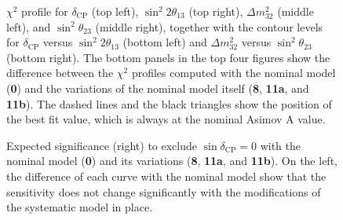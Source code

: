 \begin{figure}
	\centering
	\resizebox{0.49\linewidth}{!}{}
	\resizebox{0.49\linewidth}{!}{}
	\resizebox{0.49\linewidth}{!}{}
	\resizebox{0.49\linewidth}{!}{}
	\resizebox{0.49\linewidth}{!}{}	%
	\resizebox{0.49\linewidth}{!}{}	%
	\caption[$\chi^2$ profiles for $\delta_\text{CP}$, $\Delta m_{32}^2$, $\sin^2 2\theta_{13}$, and $\sin\theta_{23}$ %
		and contours for $\Delta m_{32}^2$ versus $\sin\theta_{23}$ and $\delta_\text{CP}$ versus $\sin^2 2\theta_{13}$ %
		with variations on the nominal systematic model]%
		{$\chi^2$ profile for $\delta_\text{CP}$ (top left), $\sin^2 2\theta_{13}$ (top right), %
		$\Delta m_{32}^2$ (middle left), and $\sin^2 \theta_{23}$ (middle right), %
		together with the contour levels for $\delta_\text{CP}$ versus $\sin^2 2\theta_{13}$ (bottom left) %
		and $\Delta m_{32}^2$ versus $\sin^2 \theta_{23}$ (bottom right).
		The bottom panels in the top four figures show the difference between the $\chi^2$ profiles computed %
		with the nominal model (\textbf{0}) and the variations of the nominal model itself %
		(\textbf{8}, \textbf{11a}, and \textbf{11b}).
		The dashed lines and the black triangles show the position of the best fit value, %
		which is always at the nominal Asimov A value.}
	\label{fig:0_11a_11b_8_profile}
\end{figure}

\begin{figure}
	\centering
	\resizebox{0.49\linewidth}{!}{}
	\resizebox{0.49\linewidth}{!}{}
	\caption[Sensitivity to $\delta_\text{CP} = 0$ with variations on the nominal systematic model]%
		{Expected significance (right) to exclude $\sin\delta_\text{CP} = 0$ with the nominal model (\textbf{0}) %
		and its variations (\textbf{8}, \textbf{11a}, and \textbf{11b}).
		On the left, the difference of each curve with the nominal model show that the sensitivity %
		does not change significantly with the modifications of the systematic model in place.}
	\label{fig:0_11a_11b_8_sensitivity}
\end{figure}


